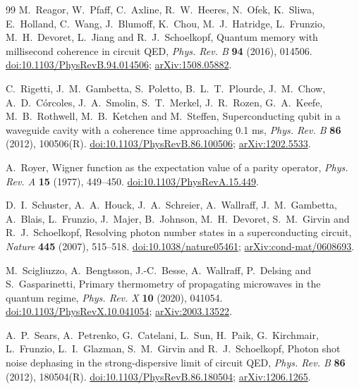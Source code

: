 \documentclass[11pt,reqno]{amsart}
\numberwithin{equation}{section}
\theoremstyle{plain}
\theoremstyle{definition}
\theoremstyle{remark}
\begin{document}
\begin{thebibliography}{99}
M.~Reagor, W.~Pfaff, C.~Axline, R.~W.~Heeres, N.~Ofek, K.~Sliwa, E.~Holland, C.~Wang, J.~Blumoff, K.~Chou, M.~J.~Hatridge, L.~Frunzio, M.~H.~Devoret, L.~Jiang and R.~J.~Schoelkopf, Quantum memory with millisecond coherence in circuit QED, \emph{Phys. Rev. B} \textbf{94} (2016), 014506.
\href{https://doi.org/10.1103/PhysRevB.94.014506}{doi:10.1103/PhysRevB.94.014506};
\href{https://arxiv.org/abs/1508.05882}{arXiv:1508.05882}.

C.~Rigetti, J.~M.~Gambetta, S.~Poletto, B.~L.~T.~Plourde, J.~M.~Chow, A.~D.~C\'orcoles, J.~A.~Smolin, S.~T.~Merkel, J.~R.~Rozen, G.~A.~Keefe, M.~B.~Rothwell, M.~B.~Ketchen and M.~Steffen, Superconducting qubit in a waveguide cavity with a coherence time approaching 0.1 ms, \emph{Phys. Rev. B} \textbf{86} (2012), 100506(R).
\href{https://doi.org/10.1103/PhysRevB.86.100506}{doi:10.1103/PhysRevB.86.100506};
\href{https://arxiv.org/abs/1202.5533}{arXiv:1202.5533}.

A.~Royer, Wigner function as the expectation value of a parity operator, \emph{Phys. Rev. A} \textbf{15} (1977), 449--450.
\href{https://doi.org/10.1103/PhysRevA.15.449}{doi:10.1103/PhysRevA.15.449}.

D.~I.~Schuster, A.~A.~Houck, J.~A.~Schreier, A.~Wallraff, J.~M.~Gambetta, A.~Blais, L.~Frunzio, J.~Majer, B.~Johnson, M.~H.~Devoret, S.~M.~Girvin and R.~J.~Schoelkopf, Resolving photon number states in a superconducting circuit, \emph{Nature} \textbf{445} (2007), 515--518.
\href{https://doi.org/10.1038/nature05461}{doi:10.1038/nature05461};
\href{https://arxiv.org/abs/cond-mat/0608693}{arXiv:cond-mat/0608693}.

M.~Scigliuzzo, A.~Bengtsson, J.-C.~Besse, A.~Wallraff, P.~Delsing and S.~Gasparinetti, Primary thermometry of propagating microwaves in the quantum regime, \emph{Phys. Rev. X} \textbf{10} (2020), 041054.
\href{https://doi.org/10.1103/PhysRevX.10.041054}{doi:10.1103/PhysRevX.10.041054};
\href{https://arxiv.org/abs/2003.13522}{arXiv:2003.13522}.

A.~P.~Sears, A.~Petrenko, G.~Catelani, L.~Sun, H.~Paik, G.~Kirchmair, L.~Frunzio, L.~I.~Glazman, S.~M.~Girvin and R.~J.~Schoelkopf, Photon shot noise dephasing in the strong-dispersive limit of circuit QED, \emph{Phys. Rev. B} \textbf{86} (2012), 180504(R).
\href{https://doi.org/10.1103/PhysRevB.86.180504}{doi:10.1103/PhysRevB.86.180504};
\href{https://arxiv.org/abs/1206.1265}{arXiv:1206.1265}.


\end{thebibliography}
\end{document}
